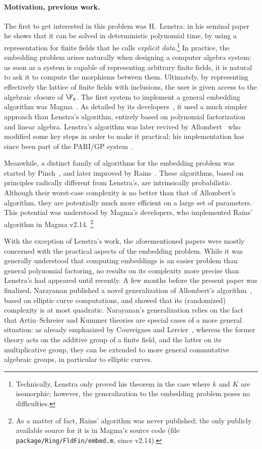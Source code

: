 \paragraph{\bf Motivation, previous work.}
The first to get interested in this problem was H.~Lenstra: in his
seminal paper~\cite{LenstraJr91} he shows that it can be solved in
deterministic polynomial time, by using a representation for finite
fields that he calls \emph{explicit data}.\footnote{Technically,
  Lenstra only proved his theorem in the case where $k$ and $K$ are
  isomorphic; however, the generalization to the embedding problem
  poses no difficulties.} %
In practice, the embedding problem arises naturally when designing a
computer algebra system: as soon as a system is capable of
representing arbitrary finite fields, it is natural to ask it to
compute the morphisms between them. %
Ultimately, by representing effectively the lattice of finite fields
with inclusions, the user is given access to the algebraic closure of
$\F_q$. %
The first system to implement a general embedding algorithm was
Magma~\cite{MAGMA}. %
As detailed by its developers~\cite{bosma+cannon+steel97}, it used a
much simpler approach than Lenstra's algorithm, entirely based on
polynomial factorization and linear algebra. %
Lenstra's algorithm was later revived by
Allombert~\cite{Allombert02,Allombert02-rev} who modified some key
steps in order to make it practical; his implementation has since been
part of the PARI/GP system~\cite{Pari}.

Meanwhile, a distinct family of algorithms for the embedding problem
was started by Pinch~\cite{Pinch}, and later improved by
Rains~\cite{rains2008}. %
These algorithms, based on principles radically different from
Lenstra's, are intrinsically probabilistic. %
Although their worst-case complexity is no better than that of
Allombert's algorithm, they are potentially much more efficient on a
large set of parameters. %
This potential was understood by Magma's developers, who implemented
Rains' algorithm in Magma v2.14.%
\footnote{As a matter of fact, Rains' algorithm was never published;
  the only publicly available source for it is in Magma's source code
  (file \texttt{package/Ring/FldFin/embed.m}, since v2.14).}

With the exception of Lenstra's work, the aforementioned papers were
mostly concerned with the practical aspects of the embedding
problem. %
While it was generally understood that computing embeddings is an
easier problem than general polynomial factoring, no results on its
complexity more precise than Lenstra's had appeared until recently. %
A few months before the present paper was finalized, Narayanan
published a novel generalization of Allombert's
algorithm~\cite{narayanan2016fast}, based on elliptic curve
computations, and showed that its (randomized) complexity is at most
quadratic.
Narayanan's
  generalization relies on the fact that Artin--Schreier and Kummer
  theories are special cases of a more general situation:
  as already emphasized by Couveignes and Lercier~\cite{CL08}, whereas
  the former theory acts on the additive group of a finite field, and
  the latter on its multiplicative group, they can be extended to more
  general commutative algebraic groups, in particular to elliptic
  curves.

